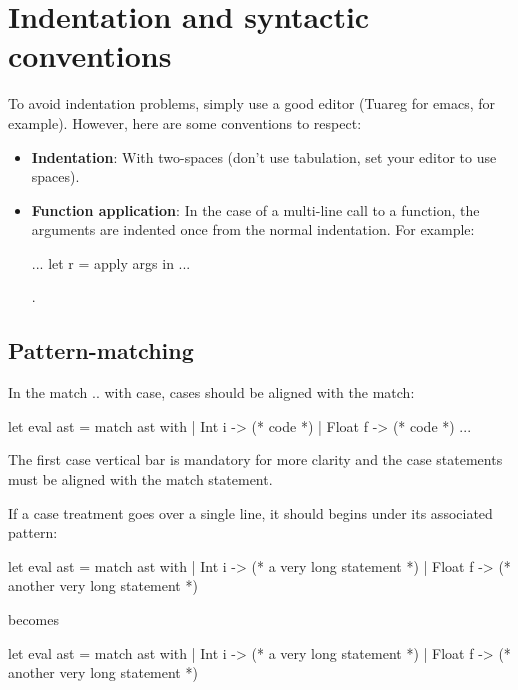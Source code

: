 \documentclass[12pt,a4paper]{article}
\begin{document}
\section{Indentation and syntactic conventions}

To avoid indentation problems, simply use a good editor (Tuareg for emacs, for
example). However, here are some conventions to respect:

\begin{itemize}
\item \textbf{Indentation}: With two-spaces (don't use tabulation, set your
  editor to use spaces).
\item \textbf{Function application}: In the case of a multi-line call to a function,
  the arguments are indented once from the normal indentation. For example:
  \begin{OCaml}
    ...
    let r = apply
      args in
    ...
  \end{OCaml}.
\end{itemize}

\subsection*{Pattern-matching}

In the \textsf{match .. with} case, cases should be aligned with the
\textsf{match}:

\begin{OCaml}
let eval ast =
  match ast with
  | Int i -> (* code *)
  | Float f -> (* code *)
  ...
\end{OCaml}

\noindent
The first case vertical bar is mandatory for more clarity and the case statements must be aligned with the match statement.
\newline

\noindent
If a case treatment goes over a single line, it should begins under its associated pattern:

\begin{OCaml}
let eval ast =
  match ast with
  | Int i -> (* a very long
    statement *)
  | Float f -> (* another very
    long statement *)
\end{OCaml}

becomes

\begin{OCaml}
let eval ast =
  match ast with
  | Int i ->
    (* a very long
    statement *)
  | Float f ->
    (* another very
    long statement *)
\end{OCaml}
\end{document}
